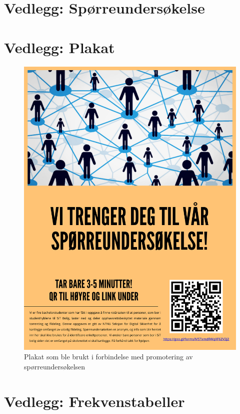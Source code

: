 \chapter{Vedlegg: Spørreundersøkelse}

\label{undersokelse}

\chapter{Vedlegg: Plakat}
\label{plakat}
\begin{figure}[H]
    \centering
    \includegraphics[scale=0.25]{case_1/bilder/plakat.pdf}
    \caption[Plakat]{Plakat som ble brukt i forbindelse med promotering av spørreundersøkelsen}
    \label{fig:plakat}
\end{figure}

\chapter{Vedlegg: Frekvenstabeller}
\label{frekvens}

